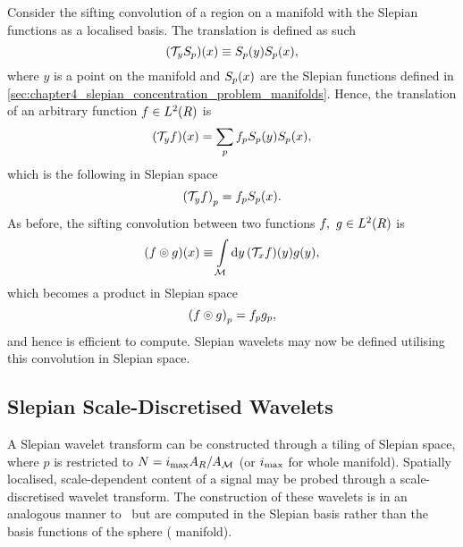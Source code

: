 Consider the sifting convolution of a region on a manifold with the Slepian functions as a localised basis.
The translation is defined as such
%
\begin{equation}
	(\mathcal{T}_{y}{S}_{p})(x)
	\equiv {S}_{p}(y) {S}_{p}(x),
\end{equation}
%
where \(y\) is a point on the manifold and \({S}_{p}(x)\) are the Slepian functions defined in \cref{sec:chapter4_slepian_concentration_problem_manifolds}.
Hence, the translation of an arbitrary function \(f \in L^{2}(R)\) is
%
\begin{equation}
	(\mathcal{T}_{y}f)(x)
	= \sum\limits_{p} {f}_{p} {S}_{p}(y) {S}_{p}(x),
\end{equation}
%
which is the following in Slepian space
%
\begin{equation}
	{(\mathcal{T}_{y}f)}_{p}
	= {f}_{p} {S}_{p}(x).
\end{equation}
%
As before, the sifting convolution between two functions \(f,\ g \in L^{2}(R)\) is
%
\begin{equation}
	(f \circledcirc{} g)(x)
	\equiv \int\limits_{\mathcal{M}} \dd{y} (\mathcal{T}_{x}f)(y) g(y),
\end{equation}
%
which becomes a product in Slepian space
%
\begin{equation}
	{(f \circledcirc{} g)}_{p}
	= {f}_{p} {g}_{p},
\end{equation}
%
and hence is efficient to compute.
Slepian wavelets may now be defined utilising this convolution in Slepian space.

\subsection{Slepian Scale-Discretised Wavelets}

A Slepian wavelet transform can be constructed through a tiling of Slepian space, where \(p\) is restricted to \(N=i_{\text{max}} A_{R}/A_{\mathcal{M}}\) (or \(i_{\text{max}}{}\) for whole manifold).
Spatially localised, scale-dependent content of a signal may be probed through a scale-discretised wavelet transform.
The construction of these wavelets is in an analogous manner to~\cite{Wiaux2008,McEwen2018} but are computed in the Slepian basis rather than the basis functions of the sphere (\cf{} manifold).

